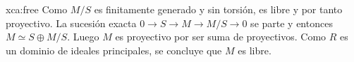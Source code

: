 \begin{sol}{xca:free}
    Como $M/S$ es finitamente generado y sin torsión, es libre y por tanto
    proyectivo. La sucesión exacta $0\to S\to M\to M/S\to0$ se
    parte y entonces $M\simeq S\oplus M/S$. Luego $M$ es proyectivo por
    ser suma de proyectivos. Como $R$ es un dominio de ideales principales, se concluye que
    $M$ es libre.
\end{sol}
